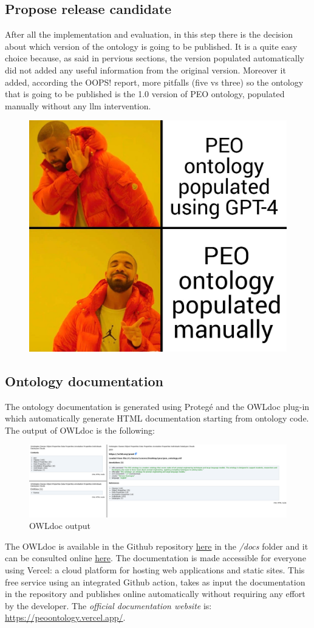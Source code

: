 \subsection{Propose release candidate}
After all the implementation and evaluation, in this step there is the decision about which version of the ontology is going to be published. It is a quite easy choice because, as said in pervious sections, the version populated automatically did not added any useful information from the original version. Moreover it added, according the OOPS! report, more pitfalls (five vs three) so the ontology that is going to be published is the 1.0 version of PEO ontology, populated manually without any llm intervention.
\begin{figure}[H]
    \centering
    \includegraphics[width=0.36\linewidth]{Figures/fig_64.jpg}
\end{figure}

\subsection{Ontology documentation}
The ontology documentation is generated using Protegé and the OWLdoc plug-in which automatically generate HTML documentation starting from ontology code. The output of OWLdoc is the following:
\begin{figure}[H]
    \centering
    \includegraphics[width=0.9\linewidth]{Figures/fig_63.png}
    \caption{OWLdoc output}
    \label{fig:enter-label}
\end{figure}
The OWLdoc is available in the Github repository \href{https://github.com/simonegramegna/peo/tree/main/docs}{here} in the \textit{/docs} folder and it can be consulted online \href{https://peoontology.vercel.app/}{here}. The documentation is made accessible for everyone using Vercel: a cloud platform for hosting web applications and static sites. This free service using an integrated Github action, takes as input the documentation in the repository and publishes online automatically without requiring any effort by the developer. The \textit{official documentation website} is:
\href{https://peoontology.vercel.app/}{https://peoontology.vercel.app/}.

